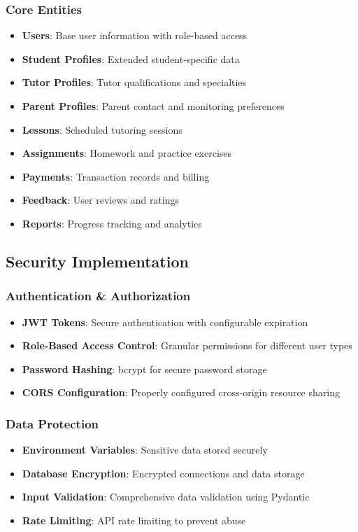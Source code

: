 \documentclass[11pt,a4paper]{article}
\begin{document}
\subsubsection{Core Entities}
\begin{itemize}
    \item \textbf{Users}: Base user information with role-based access
    \item \textbf{Student Profiles}: Extended student-specific data
    \item \textbf{Tutor Profiles}: Tutor qualifications and specialties
    \item \textbf{Parent Profiles}: Parent contact and monitoring preferences
    \item \textbf{Lessons}: Scheduled tutoring sessions
    \item \textbf{Assignments}: Homework and practice exercises
    \item \textbf{Payments}: Transaction records and billing
    \item \textbf{Feedback}: User reviews and ratings
    \item \textbf{Reports}: Progress tracking and analytics
\end{itemize}

\subsection{Security Implementation}

\subsubsection{Authentication \& Authorization}
\begin{itemize}
    \item \textbf{JWT Tokens}: Secure authentication with configurable expiration
    \item \textbf{Role-Based Access Control}: Granular permissions for different user types
    \item \textbf{Password Hashing}: bcrypt for secure password storage
    \item \textbf{CORS Configuration}: Properly configured cross-origin resource sharing
\end{itemize}

\subsubsection{Data Protection}
\begin{itemize}
    \item \textbf{Environment Variables}: Sensitive data stored securely
    \item \textbf{Database Encryption}: Encrypted connections and data storage
    \item \textbf{Input Validation}: Comprehensive data validation using Pydantic
    \item \textbf{Rate Limiting}: API rate limiting to prevent abuse
\end{itemize}
\end{document}
